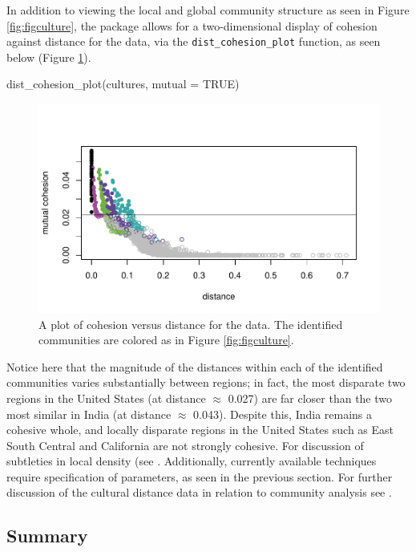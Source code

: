 In addition to viewing the local and global community structure as seen
in Figure \ref{fig:figculture}, the  package allows for a
two-dimensional display of cohesion against distance for the data, via
the \texttt{dist\_cohesion\_plot} function, as seen below (Figure
\ref{fig:figco}).

\begin{Schunk}
\begin{Sinput}
dist_cohesion_plot(cultures, mutual = TRUE)
\end{Sinput}
\begin{figure}
\includegraphics{dagostino-mcgowan_files/figure-latex/figco-1} \caption{A plot of cohesion versus distance for the data. The identified communities are colored as in Figure \ref{fig:figculture}.}\label{fig:figco}
\end{figure}
\end{Schunk}

Notice here that the magnitude of the distances within each of the
identified communities varies substantially between regions; in fact,
the most disparate two regions in the United States (at distance
\(\approx\) 0.027) are far closer than the two most similar in India (at
distance \(\approx\) 0.043). Despite this, India remains a cohesive
whole, and locally disparate regions in the United States such as East
South Central and California are not strongly cohesive. For discussion
of subtleties in local density (see \citet{berenhaut2022social}.
Additionally, currently available techniques require specification of
parameters, as seen in the previous section. For further discussion of
the cultural distance data in relation to community analysis see
\citet{berenhaut2022social}.

\hypertarget{summary}{%
\subsection{Summary}\label{summary}}

